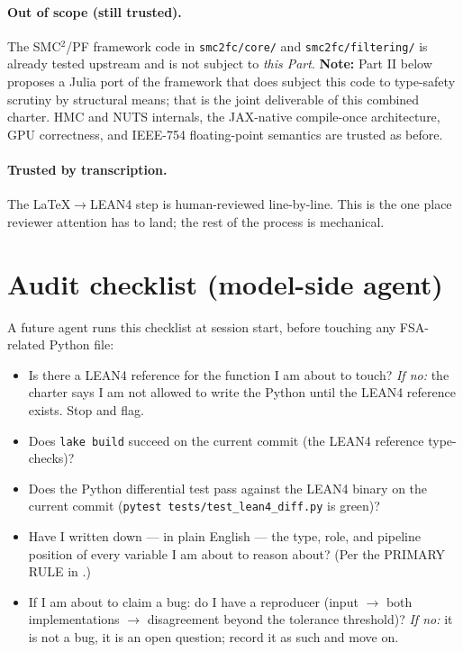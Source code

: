 \documentclass[11pt,a4paper]{article}
\begin{document}
\paragraph{Out of scope (still trusted).} The SMC$^2$/PF framework
code in \texttt{smc2fc/core/} and \texttt{smc2fc/filtering/} is
already tested upstream and is not subject to \emph{this Part}.
\textbf{Note:} Part II below proposes a Julia port of the framework
that does subject this code to type-safety scrutiny by structural
means; that is the joint deliverable of this combined charter.
HMC and NUTS internals, the JAX-native compile-once architecture,
GPU correctness, and IEEE-754 floating-point semantics are
trusted as before.

\paragraph{Trusted by transcription.} The LaTeX$\to$LEAN4 step is
human-reviewed line-by-line. This is the one place reviewer
attention has to land; the rest of the process is mechanical.

\section{Audit checklist (model-side agent)}
\label{sec:checklist-lean4}

A future agent runs this checklist at session start, before
touching any FSA-related Python file:

\begin{itemize}
\item[$\square$] Is there a LEAN4 reference for the function I am
  about to touch? \emph{If no:} the charter says I am not allowed
  to write the Python until the LEAN4 reference exists. Stop and
  flag.
\item[$\square$] Does \texttt{lake build} succeed on the current
  commit (the LEAN4 reference type-checks)?
\item[$\square$] Does the Python differential test pass against
  the LEAN4 binary on the current commit (\texttt{pytest
  tests/test\_lean4\_diff.py} is green)?
\item[$\square$] Have I written down --- in plain English ---
  the type, role, and pipeline position of every variable I am
  about to reason about? (Per the PRIMARY RULE in
  .)
\item[$\square$] If I am about to claim a bug: do I have a
  reproducer (input $\to$ both implementations $\to$ disagreement
  beyond the tolerance threshold)? \emph{If no:} it is not a bug,
  it is an open question; record it as such and move on.
\end{itemize}
\end{document}
